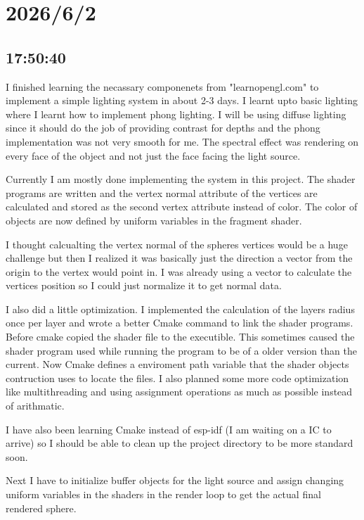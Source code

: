 \documentclass{article}
\begin{document}
\section*{2026/6/2}
\subsection*{17:50:40}
I finished learning the necassary componenets from "learnopengl.com" to implement a simple lighting system in
about 2-3 days. I learnt upto basic lighting where I learnt how to implement phong lighting. I will be using
diffuse lighting since it should do the job of providing contrast for depths and the phong implementation 
was not very smooth for me. The spectral effect was rendering on every face of the object and not just 
the face facing the light source.

Currently I am mostly done implementing the system in this project. The shader programs are written and 
the vertex normal attribute of the vertices are calculated and stored as the second vertex attribute instead
of color. The color of objects are now defined by uniform variables in the fragment shader.

I thought calcualting the vertex normal of the spheres vertices would be a huge challenge but then I 
realized it was basically just the direction a vector from the origin to the vertex would point in. I
was already using a vector to calculate the vertices position so I could just normalize it to get 
normal data.

I also did a little optimization. I implemented the calculation of the layers radius once per layer and
wrote a better Cmake command to link the shader programs. Before cmake copied the shader file to the 
executible. This sometimes caused the shader program used while running the program to be of a older
version than the current. Now Cmake defines a enviroment path variable that the shader objects contruction
uses to locate the files. I also planned some more code optimization like multithreading and using assignment
operations as much as possible instead of arithmatic.

I have also been learning Cmake instead of esp-idf (I am waiting on a IC to arrive) so I should be able to
clean up the project directory to be more standard soon.

Next I have to initialize buffer objects for the light source and assign changing uniform variables in the 
shaders in the render loop to get the actual final rendered sphere.
\end{document}
